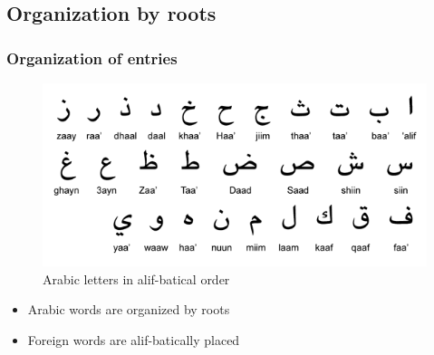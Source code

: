 \subsection{Organization by roots}
\subsubsection{Organization of entries}
\begin{figure}
	\centering
	\includegraphics[width=0.7\linewidth]{chapters/images/alphabets}
	\caption{Arabic letters in alif-batical order}
	\label{fig:alphabets}
\end{figure}


\begin{itemize}	    \setlength{\itemsep}{5pt}
	\item Arabic words are organized by roots
	\item Foreign words are alif-batically placed 
\end{itemize}

